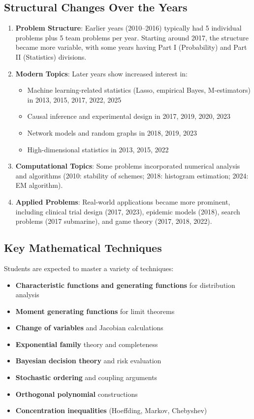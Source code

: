 \subsection{Structural Changes Over the Years}

\begin{enumerate}
    \item \textbf{Problem Structure}: Earlier years (2010--2016) typically had 5 individual problems plus 5 team problems per year. Starting around 2017, the structure became more variable, with some years having Part I (Probability) and Part II (Statistics) divisions.

    \item \textbf{Modern Topics}: Later years show increased interest in:
    \begin{itemize}
        \item Machine learning-related statistics (Lasso, empirical Bayes, M-estimators) in 2013, 2015, 2017, 2022, 2025
        \item Causal inference and experimental design in 2017, 2019, 2020, 2023
        \item Network models and random graphs in 2018, 2019, 2023
        \item High-dimensional statistics in 2013, 2015, 2022
    \end{itemize}

    \item \textbf{Computational Topics}: Some problems incorporated numerical analysis and algorithms (2010: stability of schemes; 2018: histogram estimation; 2024: EM algorithm).

    \item \textbf{Applied Problems}: Real-world applications became more prominent, including clinical trial design (2017, 2023), epidemic models (2018), search problems (2017 submarine), and game theory (2017, 2018, 2022).
\end{enumerate}

\subsection{Key Mathematical Techniques}

Students are expected to master a variety of techniques:
\begin{itemize}
    \item \textbf{Characteristic functions and generating functions} for distribution analysis
    \item \textbf{Moment generating functions} for limit theorems
    \item \textbf{Change of variables} and Jacobian calculations
    \item \textbf{Exponential family} theory and completeness
    \item \textbf{Bayesian decision theory} and risk evaluation
    \item \textbf{Stochastic ordering} and coupling arguments
    \item \textbf{Orthogonal polynomial} constructions
    \item \textbf{Concentration inequalities} (Hoeffding, Markov, Chebyshev)
\end{itemize}

